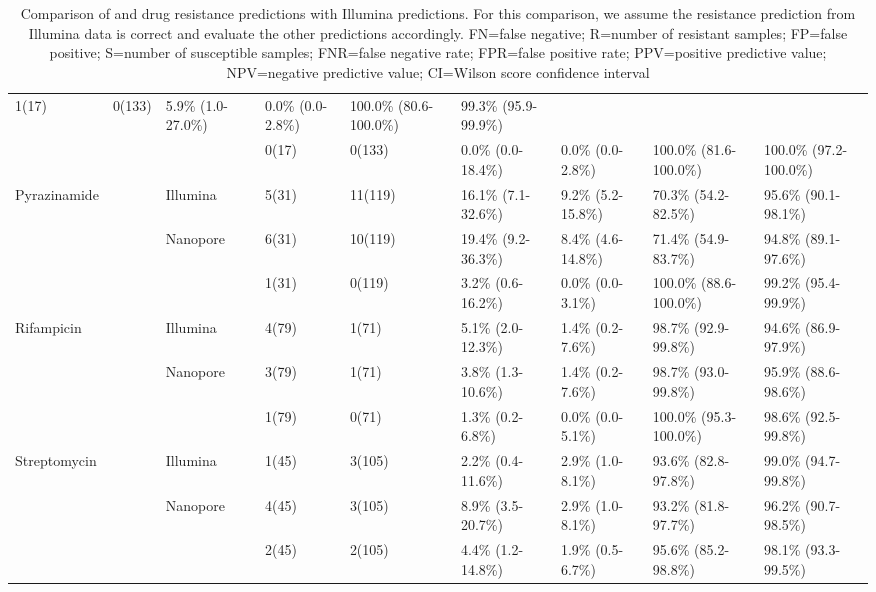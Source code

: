 \begin{table}
{\begin{tabular}{|l|l|l|l|l|l|l|l|l|}
  1(17) &
  0(133) &
  5.9\% (1.0-27.0\%) &
  0.0\% (0.0-2.8\%) &
  100.0\% (80.6-100.0\%) &
  99.3\% (95.9-99.9\%) \\ \cline{2-2} \cline{4-9} 
 &
  \mykrobe{} &
   &
  0(17) &
  0(133) &
  0.0\% (0.0-18.4\%) &
  0.0\% (0.0-2.8\%) &
  100.0\% (81.6-100.0\%) &
  100.0\% (97.2-100.0\%) \\ \hline
\multirow{3}{*}{Pyrazinamide} &
  \multirow{2}{*}{\drprg{}} &
  Illumina &
  5(31) &
  11(119) &
  16.1\% (7.1-32.6\%) &
  9.2\% (5.2-15.8\%) &
  70.3\% (54.2-82.5\%) &
  95.6\% (90.1-98.1\%) \\ \cline{3-9} 
 &
   &
  \multirow{2}{*}{Nanopore} &
  6(31) &
  10(119) &
  19.4\% (9.2-36.3\%) &
  8.4\% (4.6-14.8\%) &
  71.4\% (54.9-83.7\%) &
  94.8\% (89.1-97.6\%) \\ \cline{2-2} \cline{4-9} 
 &
  \mykrobe{} &
   &
  1(31) &
  0(119) &
  3.2\% (0.6-16.2\%) &
  0.0\% (0.0-3.1\%) &
  100.0\% (88.6-100.0\%) &
  99.2\% (95.4-99.9\%) \\ \hline
\multirow{3}{*}{Rifampicin} &
  \multirow{2}{*}{\drprg{}} &
  Illumina &
  4(79) &
  1(71) &
  5.1\% (2.0-12.3\%) &
  1.4\% (0.2-7.6\%) &
  98.7\% (92.9-99.8\%) &
  94.6\% (86.9-97.9\%) \\ \cline{3-9} 
 &
   &
  \multirow{2}{*}{Nanopore} &
  3(79) &
  1(71) &
  3.8\% (1.3-10.6\%) &
  1.4\% (0.2-7.6\%) &
  98.7\% (93.0-99.8\%) &
  95.9\% (88.6-98.6\%) \\ \cline{2-2} \cline{4-9} 
 &
  \mykrobe{} &
   &
  1(79) &
  0(71) &
  1.3\% (0.2-6.8\%) &
  0.0\% (0.0-5.1\%) &
  100.0\% (95.3-100.0\%) &
  98.6\% (92.5-99.8\%) \\ \hline
\multirow{3}{*}{Streptomycin} &
  \multirow{2}{*}{\drprg{}} &
  Illumina &
  1(45) &
  3(105) &
  2.2\% (0.4-11.6\%) &
  2.9\% (1.0-8.1\%) &
  93.6\% (82.8-97.8\%) &
  99.0\% (94.7-99.8\%) \\ \cline{3-9} 
 &
   &
  \multirow{2}{*}{Nanopore} &
  4(45) &
  3(105) &
  8.9\% (3.5-20.7\%) &
  2.9\% (1.0-8.1\%) &
  93.2\% (81.8-97.7\%) &
  96.2\% (90.7-98.5\%) \\ \cline{2-2} \cline{4-9} 
 &
  \mykrobe{} &
   &
  2(45) &
  2(105) &
  4.4\% (1.2-14.8\%) &
  1.9\% (0.5-6.7\%) &
  95.6\% (85.2-98.8\%) &
  98.1\% (93.3-99.5\%) \\ \hline
\end{tabular}%
}
\caption{Comparison of \drprg{} and \mykrobe{} \ont{} drug resistance predictions with \mykrobe{} Illumina predictions. For this comparison, we assume the \mykrobe{} resistance prediction from Illumina data is correct and evaluate the other predictions accordingly. FN=false negative; R=number of resistant samples; FP=false positive; S=number of susceptible samples; FNR=false negative rate; FPR=false positive rate; PPV=positive predictive value; NPV=negative predictive value; CI=Wilson score confidence interval}
\label{tab:geno-concordance}
\end{table}

